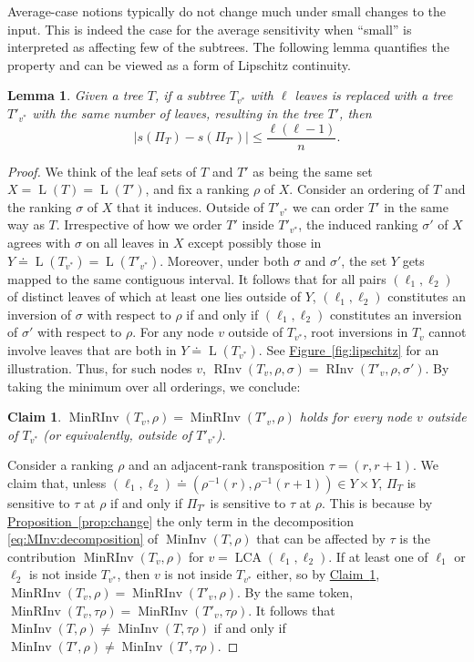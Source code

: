 \documentclass[11pt]{article}
\numberwithin{equation}{section}
\newtheorem{lemma}[theorem]{Lemma}
\newtheorem{claim}[theorem]{Claim}
\theoremstyle{definition}
\theoremstyle{plain}
\newcommand{\expref}[2]{\hyperref[#2]{#1~\ref{#2}}}
\DeclareMathOperator{\LCA}{LCA}
\DeclareMathOperator{\leafset}{L}
\newcommand{\ranking}{\rho}
\newcommand{\ordering}{\sigma}
\newcommand{\transposition}{\tau}
\DeclareMathOperator{\MInv}{MinInv}
\DeclareMathOperator{\MRInv}{MinRInv}
\DeclareMathOperator{\RInv}{RInv}
\begin{document}
Average-case notions typically do not change much under small changes to the input. This is indeed the case for the average sensitivity when ``small'' is interpreted as affecting few of the subtrees. The following lemma quantifies the property and can be viewed as a form of Lipschitz continuity.
\begin{lemma}
    \label{lemma:sensitivity:lipschitz}    
    Given a tree $T$, if a subtree $T_{v^*}$ with $\ell$ leaves is replaced with a tree $T'_{v^*}$ with the same number of leaves, resulting in the tree $T'$, then
    \[|s(\Pi_T)-s(\Pi_{T'})| \le \frac{\ell(\ell-1)}{n}. \]
\end{lemma}
\begin{proof}
We think of the leaf sets of $T$ and $T'$ as being the same set $X=\leafset(T)=\leafset(T')$, and fix a ranking $\ranking$ of $X$. Consider an ordering of $T$ and the ranking $\ordering$ of $X$ that it induces. Outside of $T'_{v^*}$ we can order $T'$ in the same way as $T$. Irrespective of how we order $T'$ inside $T'_{v^*}$, the induced ranking $\ordering'$ of $X$ agrees with $\ordering$ on all leaves in $X$ except possibly those in $Y \doteq \leafset(T_{v^*})=\leafset(T'_{v^*})$. Moreover, under both $\ordering$ and $\ordering'$, the set $Y$ gets mapped to the same contiguous interval. It follows that for all pairs $(\ell_1,\ell_2)$ of distinct leaves of which at least one lies outside of $Y$, $(\ell_1,\ell_2)$ constitutes an inversion of $\ordering$ with respect to $\ranking$ if and only if $(\ell_1,\ell_2)$ constitutes an inversion of $\ordering'$ with respect to $\ranking$. For any node $v$ outside of $T_{v^*}$, root inversions in $T_v$ cannot involve leaves that are both in $Y \doteq \leafset(T_{v^*})$. See \expref{Figure}{fig:lipschitz} for an illustration. Thus, for such nodes $v$, $\RInv(T_v,\ranking,\ordering) = \RInv(T'_v,\ranking,\ordering')$. By taking the minimum over all orderings, we conclude:
\begin{claim}\label{claim:root:insensitive}
$\MRInv(T_v,\ranking) = \MRInv(T'_v,\ranking)$ holds for every node $v$ outside of $T_{v^*}$ (or equivalently, outside of $T'_{v^*}$).
\end{claim}

Consider a ranking $\ranking$ and an adjacent-rank transposition $\transposition=(r,r+1)$. We claim that, unless $(\ell_1,\ell_2) \doteq (\ranking^{-1}(r),\ranking^{-1}(r+1)) \in Y \times Y$, $\Pi_T$ is sensitive to $\transposition$ at $\ranking$ if and only if $\Pi_{T'}$ is sensitive to $\transposition$ at $\ranking$. This is because by \expref{Proposition}{prop:change} the only term in the decomposition \eqref{eq:MInv:decomposition} of $\MInv(T,\ranking)$ that can be affected by $\transposition$ is the contribution $\MRInv(T_v,\ranking)$ for $v = \LCA(\ell_1,\ell_2)$. If at least one of $\ell_1$ or $\ell_2$ is not inside $T_{v^*}$, then $v$ is not inside $T_{v^*}$ either, so by \expref{Claim}{claim:root:insensitive}, $\MRInv(T_v,\ranking) = \MRInv(T'_v,\ranking)$. By the same token, $\MRInv(T_v,\transposition \ranking) = \MRInv(T'_v,\transposition \ranking)$. It follows that $\MInv(T,\ranking) \ne \MInv(T,\transposition \ranking)$ if and only if $\MInv(T',\ranking) \ne \MInv(T',\transposition \ranking)$.


\end{proof}
\end{document}
